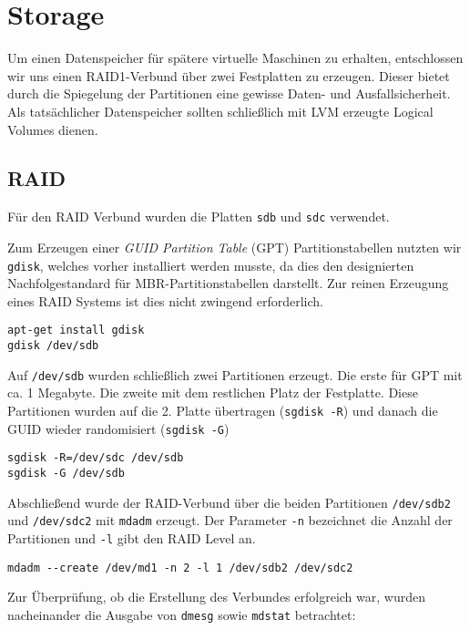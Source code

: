 \chapter{Storage}
Um einen Datenspeicher für spätere virtuelle Maschinen zu erhalten, entschlossen wir uns einen RAID1-Verbund über zwei Festplatten zu erzeugen. Dieser bietet durch die Spiegelung der Partitionen eine gewisse Daten- und Ausfallsicherheit. Als tatsächlicher Datenspeicher sollten schließlich mit LVM erzeugte Logical Volumes dienen. 
\section{RAID}
Für den RAID Verbund wurden die Platten \verb#sdb# und \verb#sdc# verwendet.

Zum Erzeugen einer \emph{GUID Partition Table} (GPT) Partitionstabellen nutzten wir \verb#gdisk#, welches vorher installiert werden musste, da dies den designierten Nachfolgestandard für MBR-Partitionstabellen darstellt. Zur reinen Erzeugung eines RAID Systems ist dies nicht zwingend erforderlich.
\begin{verbatim}
apt-get install gdisk
gdisk /dev/sdb
\end{verbatim}
Auf \verb#/dev/sdb# wurden schließlich zwei Partitionen erzeugt. Die erste für GPT mit ca. 1 Megabyte. Die zweite mit dem restlichen Platz der Festplatte.
Diese Partitionen wurden auf die 2. Platte übertragen (\verb#sgdisk -R#) und danach die GUID wieder randomisiert (\verb#sgdisk -G#)
\begin{verbatim}
sgdisk -R=/dev/sdc /dev/sdb
sgdisk -G /dev/sdb
\end{verbatim}
Abschließend wurde der RAID-Verbund über die beiden Partitionen \verb#/dev/sdb2# und \verb#/dev/sdc2# mit \verb#mdadm# erzeugt. Der Parameter \verb#-n# bezeichnet die Anzahl der Partitionen und \verb#-l# gibt den RAID Level an.
\begin{verbatim}
mdadm --create /dev/md1 -n 2 -l 1 /dev/sdb2 /dev/sdc2
\end{verbatim}
Zur Überprüfung, ob die Erstellung des Verbundes erfolgreich war, wurden nacheinander die Ausgabe von \verb#dmesg# sowie \verb#mdstat# betrachtet:
\setupVerbatimOut
